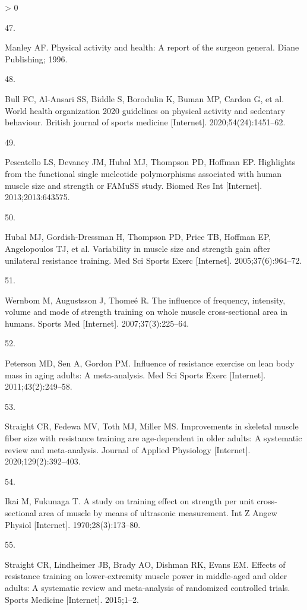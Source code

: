 \documentclass[twoside,10pt]{gihclass} %
\newlength{\cslhangindent}
\newlength{\csllabelwidth}
\newenvironment{CSLReferences}[3] %
 {%
  \setlength{\parindent}{0pt}
  \ifodd #1 \everypar{\setlength{\hangindent}{\cslhangindent}}\ignorespaces\fi
  \ifnum #2 > 0
  \setlength{\parskip}{#2\baselineskip}
  \fi
 }%
 {}
\newcommand{\CSLLeftMargin}[1]{\parbox[t]{\maxof{\widthof{#1}}{\csllabelwidth}}{#1}}
\newcommand{\CSLRightInline}[1]{\parbox[t]{\linewidth}{#1}}
\begin{document}
\begin{CSLReferences}{0}{0}
\leavevmode\hypertarget{ref-RN2666}{}%
\CSLLeftMargin{47. }
\CSLRightInline{Manley AF. Physical activity and health: A report of the surgeon general. Diane Publishing; 1996. }

\leavevmode\hypertarget{ref-RN2667}{}%
\CSLLeftMargin{48. }
\CSLRightInline{Bull FC, Al-Ansari SS, Biddle S, Borodulin K, Buman MP, Cardon G, et al. World health organization 2020 guidelines on physical activity and sedentary behaviour. British journal of sports medicine {[}Internet{]}. 2020;54(24):1451--62. }

\leavevmode\hypertarget{ref-RN1263}{}%
\CSLLeftMargin{49. }
\CSLRightInline{Pescatello LS, Devaney JM, Hubal MJ, Thompson PD, Hoffman EP. Highlights from the functional single nucleotide polymorphisms associated with human muscle size and strength or FAMuSS study. Biomed Res Int {[}Internet{]}. 2013;2013:643575. }

\leavevmode\hypertarget{ref-RN764}{}%
\CSLLeftMargin{50. }
\CSLRightInline{Hubal MJ, Gordish-Dressman H, Thompson PD, Price TB, Hoffman EP, Angelopoulos TJ, et al. Variability in muscle size and strength gain after unilateral resistance training. Med Sci Sports Exerc {[}Internet{]}. 2005;37(6):964--72. }

\leavevmode\hypertarget{ref-RN346}{}%
\CSLLeftMargin{51. }
\CSLRightInline{Wernbom M, Augustsson J, Thomeé R. The influence of frequency, intensity, volume and mode of strength training on whole muscle cross-sectional area in humans. Sports Med {[}Internet{]}. 2007;37(3):225--64. }

\leavevmode\hypertarget{ref-RN752}{}%
\CSLLeftMargin{52. }
\CSLRightInline{Peterson MD, Sen A, Gordon PM. Influence of resistance exercise on lean body mass in aging adults: A meta-analysis. Med Sci Sports Exerc {[}Internet{]}. 2011;43(2):249--58. }

\leavevmode\hypertarget{ref-RN2669}{}%
\CSLLeftMargin{53. }
\CSLRightInline{Straight CR, Fedewa MV, Toth MJ, Miller MS. Improvements in skeletal muscle fiber size with resistance training are age-dependent in older adults: A systematic review and meta-analysis. Journal of Applied Physiology {[}Internet{]}. 2020;129(2):392--403. }

\leavevmode\hypertarget{ref-RN2629}{}%
\CSLLeftMargin{54. }
\CSLRightInline{Ikai M, Fukunaga T. A study on training effect on strength per unit cross-sectional area of muscle by means of ultrasonic measurement. Int Z Angew Physiol {[}Internet{]}. 1970;28(3):173--80. }

\leavevmode\hypertarget{ref-RN1710}{}%
\CSLLeftMargin{55. }
\CSLRightInline{Straight CR, Lindheimer JB, Brady AO, Dishman RK, Evans EM. Effects of resistance training on lower-extremity muscle power in middle-aged and older adults: A systematic review and meta-analysis of randomized controlled trials. Sports Medicine {[}Internet{]}. 2015;1--2. }


\end{CSLReferences}
\end{document}

